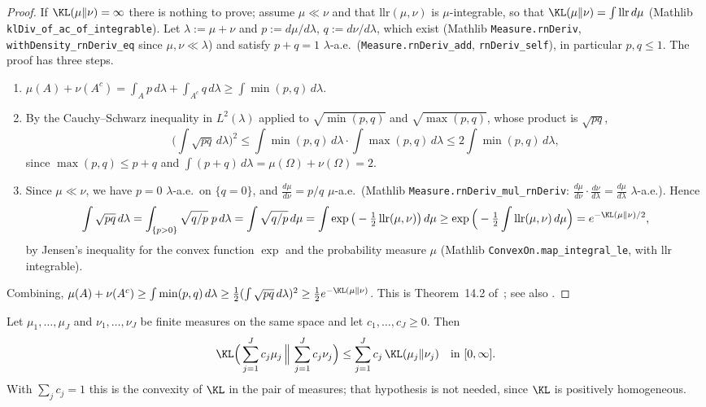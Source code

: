 \begin{proof}
\leanok
If $\KL(\mu\|\nu) = \infty$ there is nothing to prove; assume $\mu \ll \nu$ and that
$\mathrm{llr}(\mu,\nu)$ is $\mu$-integrable, so that $\KL(\mu\|\nu) = \int \mathrm{llr}\,d\mu$
(Mathlib \texttt{klDiv\_of\_ac\_of\_integrable}). Let $\lambda := \mu + \nu$ and
$p := d\mu/d\lambda$, $q := d\nu/d\lambda$, which exist (Mathlib
\texttt{Measure.rnDeriv}, \texttt{withDensity\_rnDeriv\_eq} since $\mu,\nu \ll \lambda$) and
satisfy $p + q = 1$ $\lambda$-a.e.\ (\texttt{Measure.rnDeriv\_add}, \texttt{rnDeriv\_self}), in
particular $p, q \le 1$. The proof has three steps.
\begin{enumerate}
  \item[(i)] $\mu(A) + \nu(A^c) = \int_A p\,d\lambda + \int_{A^c} q\,d\lambda \ge \int \min(p,q)\,d\lambda$.
  \item[(ii)] By the Cauchy--Schwarz inequality in $L^2(\lambda)$ applied to
        $\sqrt{\min(p,q)}$ and $\sqrt{\max(p,q)}$, whose product is $\sqrt{pq}$,
        \[
          \Big(\int\sqrt{pq}\,d\lambda\Big)^2 \le \int\min(p,q)\,d\lambda\cdot\int\max(p,q)\,d\lambda
          \le 2\int \min(p,q)\,d\lambda ,
        \]
        since $\max(p,q) \le p + q$ and $\int (p+q)\,d\lambda = \mu(\Omega) + \nu(\Omega) = 2$.
  \item[(iii)] Since $\mu \ll \nu$, we have $p = 0$ $\lambda$-a.e.\ on $\{q = 0\}$, and
        $\frac{d\mu}{d\nu} = p/q$ $\mu$-a.e.\ (Mathlib \texttt{Measure.rnDeriv\_mul\_rnDeriv}:
        $\frac{d\mu}{d\nu}\cdot\frac{d\nu}{d\lambda} = \frac{d\mu}{d\lambda}$ $\lambda$-a.e.). Hence
        \[
          \int \sqrt{pq}\,d\lambda = \int_{\{p>0\}} \sqrt{q/p}\;p\,d\lambda
          = \int \sqrt{q/p}\,d\mu = \int \exp\big(-\tfrac12\,\mathrm{llr}(\mu,\nu)\big)\,d\mu
          \ge \exp\Big(-\tfrac12\int \mathrm{llr}(\mu,\nu)\,d\mu\Big)
          = e^{-\KL(\mu\|\nu)/2},
        \]
        by Jensen's inequality for the convex function $\exp$ and the probability measure
        $\mu$ (Mathlib \texttt{ConvexOn.map\_integral\_le}, with $\mathrm{llr}$ integrable).
\end{enumerate}
Combining, $\mu(A) + \nu(A^c) \ge \int\min(p,q)\,d\lambda \ge \tfrac12 (\int\sqrt{pq}\,d\lambda)^2
\ge \tfrac12 e^{-\KL(\mu\|\nu)}$. This is Theorem~14.2 of~\cite{lattimore2020bandit}; see also
\cite{tsybakov2009introduction}.
\end{proof}

\begin{lemma}\label{lem:kl_joint_convex}
\leanok
Let $\mu_1,\dots,\mu_J$ and $\nu_1,\dots,\nu_J$ be finite measures on the same space and let
$c_1,\dots,c_J \ge 0$. Then
\[
  \KL\Big(\sum_{j=1}^J c_j\mu_j \,\Big\|\, \sum_{j=1}^J c_j\nu_j\Big)
  \le \sum_{j=1}^J c_j\,\KL(\mu_j\|\nu_j) \quad\text{in } [0,\infty].
\]
With $\sum_j c_j = 1$ this is the convexity of $\KL$ in the pair of measures; that hypothesis is
not needed, since $\KL$ is positively homogeneous.
\end{lemma}

